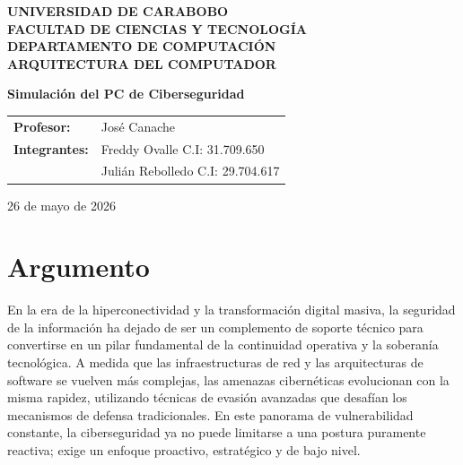 \documentclass[12pt, a4paper]{article}
\begin{document}
\begin{titlepage}
    \centering
    {\large \textbf{UNIVERSIDAD DE CARABOBO}} \\
    {\large \textbf{FACULTAD DE CIENCIAS Y TECNOLOGÍA}} \\
    {\large \textbf{DEPARTAMENTO DE COMPUTACIÓN}} \\
    {\large \textbf{ARQUITECTURA DEL COMPUTADOR}} \\
    
    \vspace{4cm}
    
    {\LARGE \textbf{Simulación del PC de Ciberseguridad}} \\
    
    \vfill
    
    \begin{flushright}
        \begin{tabular}{ll}
            \textbf{Profesor:} & José Canache \\
            \textbf{Integrantes:} & Freddy Ovalle C.I: 31.709.650 \\
                                 & Julián Rebolledo C.I: 29.704.617 \\

        \end{tabular}
    \end{flushright}
    
    \vfill
    
    {\large 26 de mayo de 2026}
\end{titlepage}

\newpage
{}

\section*{Argumento}
En la era de la hiperconectividad y la transformación digital masiva, la seguridad de la información ha dejado de ser un complemento de soporte técnico para convertirse en un pilar fundamental de la continuidad operativa y la soberanía tecnológica. A medida que las infraestructuras de red y las arquitecturas de software se vuelven más complejas, las amenazas cibernéticas evolucionan con la misma rapidez, utilizando técnicas de evasión avanzadas que desafían los mecanismos de defensa tradicionales. En este panorama de vulnerabilidad constante, la ciberseguridad ya no puede limitarse a una postura puramente reactiva; exige un enfoque proactivo, estratégico y de bajo nivel.
\end{document}
